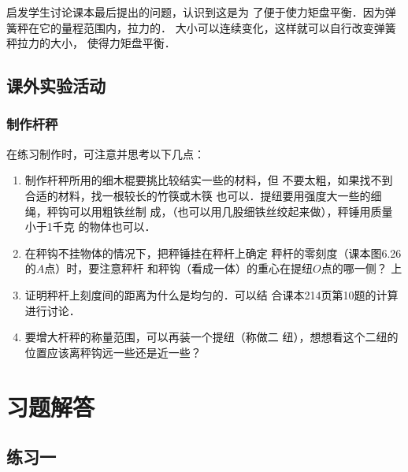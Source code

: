 启发学生讨论课本最后提出的问题，认识到这是为
了便于使力矩盘平衡．因为弹簧秤在它的量程范围内，拉力的．
大小可以连续变化，这样就可以自行改变弹簧秤拉力的大小，
使得力矩盘平衡．

\subsection{课外实验活动}
\subsubsection{制作杆秤}
在练习制作时，可注意并思考以下几点：
\begin{enumerate}
\item 制作杆秤所用的细木棍要挑比较结实一些的材料，但
不要太粗，如果找不到合适的材料，找一根较长的竹筷或木筷
也可以．提纽要用强度大一些的细绳，秤钩可以用粗铁丝制
成，（也可以用几股细铁丝绞起来做），秤锤用质量小于1千克
的物体也可以．
\item 在秤钩不挂物体的情况下，把秤锤挂在秤杆上确定
秤杆的零刻度（课本图6.26的$A$点）时，要注意秤杆
和秤钩（看成一体）的重心在提纽$O$点的哪一侧？
上
\item 证明秤杆上刻度间的距离为什么是均匀的．可以结
合课本214页第10题的计算进行讨论．
\item 要增大杆秤的称量范围，可以再装一个提纽（称做二
纽），想想看这个二纽的位置应该离秤钩远一些还是近一些？
\end{enumerate}


\section{习题解答}

\subsection{练习一}


